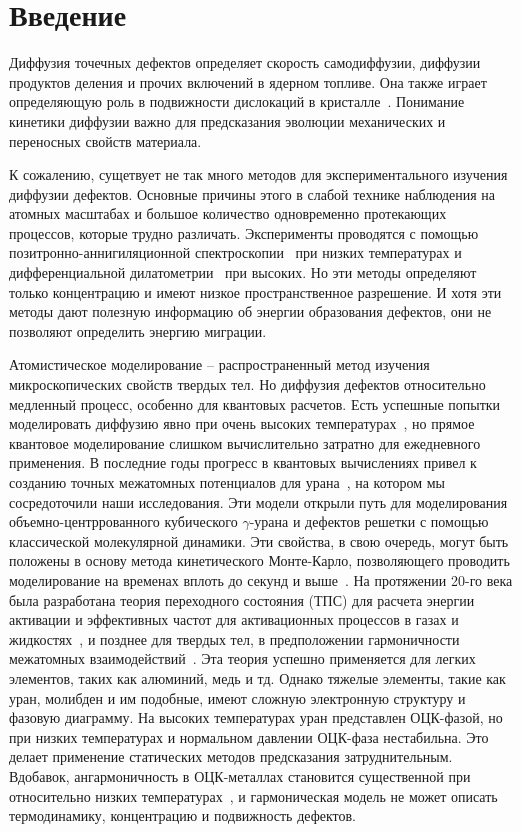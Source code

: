 \documentclass[master,14pt,subf,href,colorlinks=true
]{disser}
\begin{document}
\tableofcontents

\section{Введение}
Диффузия точечных дефектов определяет скорость самодиффузии, диффузии продуктов деления и прочих включений в ядерном топливе. Она также играет определяющую роль в подвижности дислокаций в кристалле~\cite{dislocation_mobility}.
Понимание кинетики диффузии важно для предсказания эволюции механических и переносных свойств материала.

К сожалению, сущетвует не так много методов для экспериментального изучения диффузии дефектов. Основные причины этого в слабой технике наблюдения на атомных масштабах и большое количество одновременно протекающих процессов, которые трудно различать. Эксперименты проводятся с помощью позитронно-аннигиляционной спектроскопии~\cite{Hehenkamp_experiments_1994, Positron_annihilation_Poland, Positron_annihilation_India, Positron_annihilation_France} при низких температурах и дифференциальной дилатометрии~\cite{Hehenkamp_experiments_1994} при высоких. Но эти методы определяют только концентрацию и имеют низкое пространственное разрешение. И хотя эти методы дают полезную информацию об энергии образования дефектов, они не позволяют определить энергию миграции.

Атомистическое моделирование -- распространенный метод изучения микроскопических свойств твердых тел. Но диффузия дефектов относительно медленный процесс, особенно для квантовых расчетов. Есть успешные попытки моделировать диффузию явно при очень высоких температурах~\cite{Mattsson_DFT_Mo}, но прямое квантовое моделирование слишком вычислительно затратно для ежедневного применения.
В последние годы прогресс в квантовых вычислениях привел к созданию точных межатомных потенциалов для урана~\cite{U_SSS_2012, U_Mo_Xe_2013, U_MEAM_Beeler, U_MEAM_Argentine}, на котором мы сосредоточили наши исследования. Эти модели открыли путь для моделирования объемно-центррованного кубического $\gamma$-урана и дефектов решетки с помощью классической молекулярной динамики. Эти свойства, в свою очередь, могут быть положены в основу метода кинетического Монте-Карло, позволяющего проводить моделирование на временах вплоть до секунд и выше~\cite{kMC_1991}.
На протяжении 20-го века была разработана теория переходного состояния (ТПС) для расчета энергии активации и эффективных частот для активационных процессов в газах и жидкостях~\cite{Eyring}, и позднее для твердых тел, в предположении гармоничности межатомных взаимодействий~\cite{Vineyard, Manley_1960, Glyde_1967}. Эта теория успешно применяется для легких элементов, таких как алюминий, медь и тд.
Однако тяжелые элементы, такие как уран, молибден и им подобные, имеют сложную электронную структуру и фазовую диаграмму. На высоких температурах уран представлен ОЦК-фазой, но при низких температурах и нормальном давлении ОЦК-фаза нестабильна. Это делает применение статических методов предсказания затруднительным. Вдобавок, ангармоничность в ОЦК-металлах становится существенной при относительно низких температурах~\cite{Asker_bcc_Mo_instability,Ozolins_bcc_W_instability}, и гармоническая модель не может описать термодинамику, концентрацию и подвижность дефектов.
\end{document}
